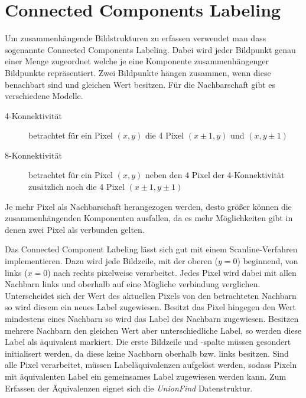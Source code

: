 \section*{Connected Components Labeling}

Um zusammenhängende Bildstrukturen zu erfassen verwendet man dass sogenannte
Connected Components Labeling. Dabei wird jeder Bildpunkt genau einer Menge
zugeordnet welche je eine Komponente zusammenhängenger Bildpunkte repräsentiert.
Zwei Bildpunkte hängen zusammen, wenn diese benachbart sind und gleichen Wert
besitzen. Für die Nachbarschaft gibt es verschiedene Modelle.

\begin{description}
  \item[4-Konnektivität]
    betrachtet für ein Pixel $(x,y)$ die 4 Pixel $(x\pm1,y)$ und $(x,y\pm1)$
  \item[8-Konnektivität]
    betrachtet für ein Pixel $(x,y)$ neben den 4 Pixel der 4-Konnektivität
    zusätzlich noch die 4 Pixel $(x\pm1,y\pm1)$
\end{description}
Je mehr Pixel als Nachbarschaft herangezogen werden, desto größer können die
zusammenhängenden Komponenten ausfallen, da es mehr Möglichkeiten gibt in denen
zwei Pixel als verbunden gelten.

Das Connected Component Labeling lässt sich gut mit einem Scanline-Verfahren
implementieren.
Dazu wird jede Bildzeile, mit der oberen ($y=0$) beginnend, von links ($x=0$)
nach rechts pixelweise verarbeitet.
Jedes Pixel wird dabei mit allen Nachbarn links und oberhalb auf eine Mögliche
verbindung verglichen.
Unterscheidet sich der Wert des aktuellen Pixels von den betrachteten Nachbarn
so wird diesem ein neues Label zugewiesen.
Besitzt das Pixel hingegen den Wert mindestens eines Nachbarn so wird das Label
des Nachbarn zugewiesen.
Besitzen mehrere Nachbarn den gleichen Wert aber unterschiedliche Label, so
werden diese Label als äquivalent markiert.
Die erste Bildzeile und -spalte müssen gesondert initialisert werden, da diese
keine Nachbarn oberhalb bzw. links besitzen.
Sind alle Pixel verarbeitet, müssen Labeläquivalenzen aufgelöst werden, sodass
Pixeln mit äquivalenten Label ein gemeinsames Label zugewiesen werden kann.
Zum Erfassen der Äquivalenzen eignet sich die \emph{UnionFind} Datenstruktur.

